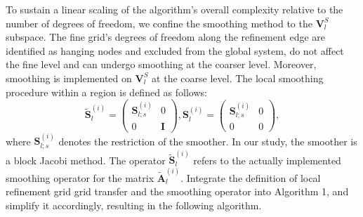 \documentclass[extra, referee]{gji}
\begin{document}
To sustain a linear scaling of the algorithm's overall complexity relative to
the number of degrees of freedom, we confine the smoothing method to the
$\mathbf{V}_l^S$ subspace. The fine grid's degrees of freedom along the
refinement edge are identified as hanging nodes and excluded from the global
system, do not affect the fine level and can undergo smoothing at the coarser
level. Moreover, smoothing is implemented on $\mathbf{V}_l^S$ at the coarse
level. The local smoothing procedure within a region is defined as follows:
\begin{equation}
    \tilde{\mathbf{S}}^{(i)}_l =
    \begin{pmatrix}
      \mathbf{S}^{(i)}_{l;s} & 0 \\ 0 & \mathbf{I}
    \end{pmatrix},
    \mathbf{S}^{(i)}_l =
    \begin{pmatrix}
      \mathbf{S}^{(i)}_{l;s} & 0 \\ 0 & 0
    \end{pmatrix},
\end{equation}
where $\mathbf{S}^{(i)}_{l;s}$ denotes the restriction of the smoother. In our
study, the smoother is a block Jacobi method. The operator
$\tilde{\mathbf{S}}^{(i)}_l$ refers to the actually implemented smoothing
operator for the matrix $\tilde{\mathbf{A}}^{(i)}_l$. Integrate the definition
of local refinement grid grid transfer and the smoothing operator into Algorithm
1, and simplify it accordingly, resulting in the following algorithm.
\end{document}

